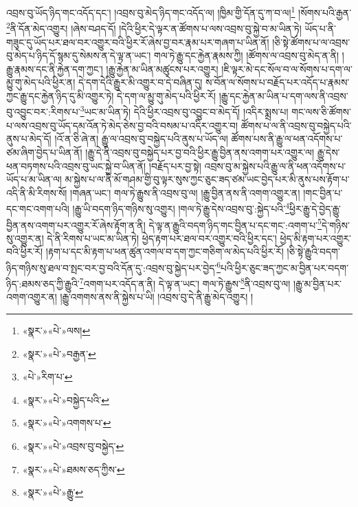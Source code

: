 འབྲས་བུ་ཡོད་ཉིད་གང་འདོད་དང་། །འབྲས་བུ་མེད་ཉིད་གང་འདོད་ལ། །ཁྱིམ་གྱི་དོན་དུ་ཀ་བ་ལ།\footnote{«སྣར་»«པེ་»ལས།} །སོགས་པའི་རྒྱན་\footnote{«སྣར་»«པེ་»བརྒྱན་}ནི་དོན་མེད་འགྱུར། །ཞེས་བཤད་དོ། །དེའི་ཕྱིར་དེ་ལྟར་ན་ཚོགས་པ་ལས་འབྲས་བུ་སྐྱེ་བ་མ་ཡིན་ཏེ། ཡོད་པ་ནི་གཟུང་དུ་ཡོད་པར་ཐལ་བར་འགྱུར་བའི་ཕྱིར་རོ་ཞེས་བྱ་བར་རྣམ་པར་གཞག་པ་ཡིན་ནོ། །ཅི་སྟེ་ཚོགས་པ་ལ་འབྲས་བུ་མེད་པ་ཉིད་དོ་སྙམ་དུ་སེམས་ན་དེ་ལྟ་ན་ཡང་། གལ་ཏེ་རྒྱུ་དང་རྐྱེན་རྣམས་ཀྱི། །ཚོགས་ལ་འབྲས་བུ་མེད་ན་ནི། །རྒྱུ་རྣམས་དང་ནི་རྐྱེན་དག་ཀྱང་། །རྒྱུ་རྐྱེན་མ་ཡིན་མཚུངས་པར་འགྱུར། །ཇི་ལྟར་མེ་དང་སོལ་བ་ལ་སོགས་པ་དག་ལ་མྱུ་གུ་མེད་པའི་ཕྱིར་ན། དེ་དག་དེའི་རྒྱུར་མི་འགྱུར་བ་དེ་བཞིན་དུ། ས་བོན་ལ་སོགས་པ་བརྗོད་པར་འདོད་པ་རྣམས་ཀྱང་རྒྱུ་དང་རྐྱེན་ཉིད་དུ་མི་འགྱུར་ཏེ། དེ་དག་ལ་མྱུ་གུ་མེད་པའི་ཕྱིར་རོ། །རྒྱུ་དང་རྐྱེན་མ་ཡིན་པ་དག་ལས་ནི་འབྲས་བུ་འབྱུང་བར་:རིགས་པ་\footnote{«པེ་»རིག་པ་}ཡང་མ་ཡིན་ཏེ། དེའི་ཕྱིར་འབྲས་བུ་འབྱུང་བ་མེད་དོ། །འདིར་སྨྲས་པ། གང་ལས་ཅི་ཚོགས་པ་ལས་འབྲས་བུ་ཡོད་དམ་འོན་ཏེ་མེད་ཅེས་བྱ་བའི་བསམ་པ་འདིར་འགྱུར་བ། ཚོགས་པ་ལ་ནི་འབྲས་བུ་བསྐྱེད་པའི་ནུས་པ་མེད་དོ། །འོ་ན་ཅི་ཞེ་ན། རྒྱུ་ལ་འབྲས་བུ་བསྐྱེད་པའི་ནུས་པ་ཡོད་ལ། ཚོགས་པས་ནི་རྒྱུ་ལ་ཕན་འདོགས་པ་ཙམ་ཞིག་བྱེད་པ་ཡིན་ནོ། །རྒྱུ་དེ་ནི་འབྲས་བུ་བསྐྱེད་པར་བྱ་བའི་ཕྱིར་རྒྱུ་བྱིན་ནས་འགག་པར་འགྱུར་ལ། རྒྱུ་དེས་ཕན་བཏགས་པའི་འབྲས་བུ་ཡང་སྐྱེ་བ་ཡིན་ནོ། །བརྗོད་པར་བྱ་སྟེ། འབྲས་བུ་མ་སྐྱེས་པའི་རྒྱུ་ལ་ནི་ཕན་འདོགས་པ་ཡོད་པ་མ་ཡིན་ལ། མ་སྐྱེས་པ་ལ་ནི་མོ་གཤམ་གྱི་བུ་ལྟར་སུས་ཀྱང་ཅུང་ཟད་ཙམ་ཡང་བྱེད་པར་མི་ནུས་པས་རྟོག་པ་འདི་ནི་མི་རིགས་སོ། །གཞན་ཡང་། གལ་ཏེ་རྒྱུས་ནི་འབྲས་བུ་ལ། །རྒྱུ་བྱིན་ནས་ནི་འགག་འགྱུར་ན། །གང་བྱིན་པ་དང་གང་འགག་པའི། །རྒྱུ་ཡི་བདག་ཉིད་གཉིས་སུ་འགྱུར། །གལ་ཏེ་རྒྱུ་དེས་འབྲས་བུ་:སྐྱེད་པའི་\footnote{«སྣར་»«པེ་»བསྐྱེད་པའི་}ཕྱིར་རྒྱུ་དེ་བྱེད་རྒྱུ་བྱིན་ནས་འགག་པར་འགྱུར་རོ་ཞེས་རྟོག་ན་ནི། དེ་ལྟ་ན་རྒྱུའི་བདག་ཉིད་གང་བྱིན་པ་དང་གང་:འགག་པ་\footnote{«སྣར་»«པེ་»འགགས་པ་}དེ་གཉིས་སུ་འགྱུར་ན། དེ་ནི་རིགས་པ་ཡང་མ་ཡིན་ཏེ། ཕྱེད་རྟག་པར་ཐལ་བར་འགྱུར་བའི་ཕྱིར་དང་། ཕྱེད་མི་རྟག་པར་འགྱུར་བའི་ཕྱིར་རོ། །རྟག་པ་དང་མི་རྟག་པ་ཕན་ཚུན་འགལ་བ་དག་ཀྱང་གཅིག་ལ་མེད་པའི་ཕྱིར་རོ། །ཅི་སྟེ་རྒྱུའི་བདག་ཉིད་གཉིས་སུ་ཐལ་བ་སྤང་བར་བྱ་བའི་དོན་དུ་:འབྲས་བུ་སྐྱེད་པར་བྱེད་\footnote{«སྣར་»«པེ་»འབྲས་བུ་བསྐྱེད་}པའི་ཕྱིར་ཅུང་ཟད་ཀྱང་མ་བྱིན་པར་བདག་ཉིད་:ཐམས་ཅད་ཀྱི་རྒྱུའི་\footnote{«སྣར་»«པེ་»ཐམས་ཅད་ཀྱིས་}འགག་པར་འདོད་ན་ནི། དེ་ལྟ་ན་ཡང་། གལ་ཏེ་རྒྱུས་\footnote{«སྣར་»«པེ་»རྒྱུ་}ནི་འབྲས་བུ་ལ། །རྒྱུ་མ་བྱིན་པར་འགག་འགྱུར་ན། །རྒྱུ་འགགས་ནས་ནི་སྐྱེས་པ་ཡི། །འབྲས་བུ་དེ་ནི་རྒྱུ་མེད་འགྱུར། །
